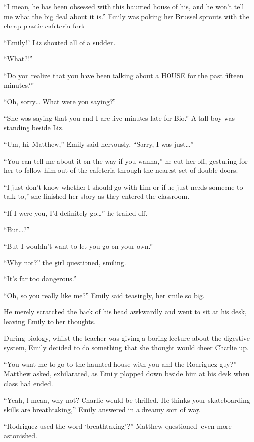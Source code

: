 “I mean, he has been obsessed with this haunted house of his, and he won't tell me what the big deal about it is.” Emily was poking her Brussel sprouts with the cheap plastic cafeteria fork.

“Emily!” Liz shouted all of a sudden.

“What?!”

“Do you realize that you have been talking about a HOUSE for the past fifteen minutes?”

“Oh, sorry… What were you saying?”

“She was saying that you and I are five minutes late for Bio.” A tall boy was standing beside Liz.

“Um, hi, Matthew,” Emily said nervously, “Sorry, I was just…”

“You can tell me about it on the way if you wanna,” he cut her off, gesturing for her to follow him out of the cafeteria through the nearest set of double doors.

\bigskip

“I just don't know whether I should go with him or if he just needs someone to talk to,” she finished her story as they entered the classroom.

“If I were you, I'd definitely go…” he trailed off.

“But…?”

“But I wouldn't want to let you go on your own.”

“Why not?” the girl questioned, smiling.

“It's far too dangerous.”

“Oh, so you really like me?” Emily said teasingly, her smile so big.

He merely scratched the back of his head awkwardly and went to sit at his desk, leaving Emily to her thoughts.

During biology, whilst the teacher was giving a boring lecture about the digestive system, Emily decided to do something that she thought would cheer Charlie up.

\bigskip

“You want me to go to the haunted house with you and the Rodriguez guy?” Matthew asked, exhilarated, as Emily plopped down beside him at his desk when class had ended.

“Yeah, I mean, why not? Charlie would be thrilled. He thinks your skateboarding skills are breathtaking,” Emily answered in a dreamy sort of way.

“Rodriguez used the word ‘breathtaking'?” Matthew questioned, even more astonished.


